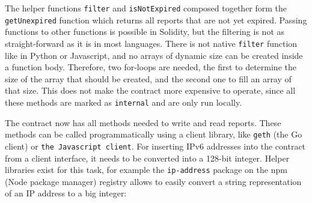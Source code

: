

The helper functions \texttt{filter} and \texttt{isNotExpired} composed together form the \texttt{getUnexpired} function which returns all reports that are not yet expired. Passing functions to other functions is possible in Solidity, but the filtering is not as straight-forward as it is in most languages. There is not native \texttt{filter} function like in Python or Javascript, and no arrays of dynamic size can be created inside a function body. Therefore, two for-loops are needed, the first to determine the size of the array that should be created, and the second one to fill an array of that size. This does not make the contract more expensive to operate, since all these methods are marked as \texttt{internal} and are only run locally.

The contract now has all methods needed to write and read reports. These methods can be called programmatically using a client library, like \texttt{geth} (the Go client) or \texttt{the Javascript client}. For inserting IPv6 addresses into the contract from a client interface, it needs to be converted into a 128-bit integer. Helper libraries exist for this task, for example the \texttt{ip-address} package on the npm (Node package manager) registry allows to easily convert a string representation of an IP address to a big integer:


